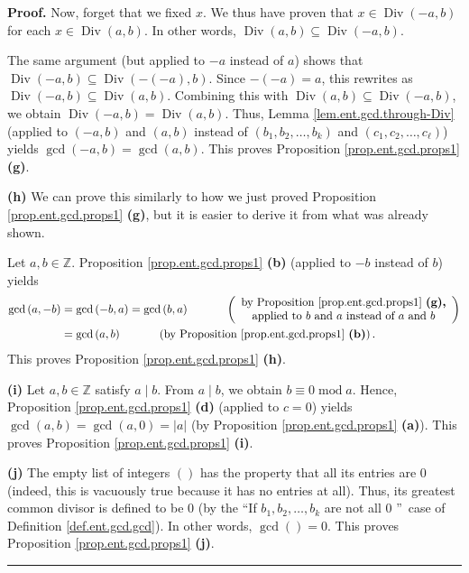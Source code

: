 \documentclass[numbers=enddot,12pt,final,onecolumn,notitlepage]{scrartcl}%
\numberwithin{exer}{subsection}
\theoremstyle{definition}
\newenvironment{proof}[1][Proof]{\noindent\textbf{#1.} }{\ \rule{0.5em}{0.5em}}
\begin{document}
\begin{proof}
Now, forget that we fixed $x$. We thus have proven that $x\in
\operatorname*{Div}\left(  -a,b\right)  $ for each $x\in\operatorname*{Div}%
\left(  a,b\right)  $. In other words, $\operatorname*{Div}\left(  a,b\right)
\subseteq\operatorname*{Div}\left(  -a,b\right)  $.

The same argument (but applied to $-a$ instead of $a$) shows that
$\operatorname*{Div}\left(  -a,b\right)  \subseteq\operatorname*{Div}\left(
-\left(  -a\right)  ,b\right)  $. Since $-\left(  -a\right)  =a$, this
rewrites as $\operatorname*{Div}\left(  -a,b\right)  \subseteq
\operatorname*{Div}\left(  a,b\right)  $. Combining this with
$\operatorname*{Div}\left(  a,b\right)  \subseteq\operatorname*{Div}\left(
-a,b\right)  $, we obtain $\operatorname*{Div}\left(  -a,b\right)
=\operatorname*{Div}\left(  a,b\right)  $. Thus, Lemma
\ref{lem.ent.gcd.through-Div} (applied to $\left(  -a,b\right)  $ and $\left(
a,b\right)  $ instead of $\left(  b_{1},b_{2},\ldots,b_{k}\right)  $ and
$\left(  c_{1},c_{2},\ldots,c_{\ell}\right)  $) yields $\gcd\left(
-a,b\right)  =\gcd\left(  a,b\right)  $. This proves Proposition
\ref{prop.ent.gcd.props1} \textbf{(g)}.

\textbf{(h)} We can prove this similarly to how we just proved Proposition
\ref{prop.ent.gcd.props1} \textbf{(g)}, but it is easier to derive it from
what was already shown.

Let $a,b\in\mathbb{Z}$. Proposition \ref{prop.ent.gcd.props1} \textbf{(b)}
(applied to $-b$ instead of $b$) yields%
\begin{align*}
\gcd\left(  a,-b\right)   &  =\gcd\left(  -b,a\right)  =\gcd\left(
b,a\right)  \ \ \ \ \ \ \ \ \ \ \left(
\begin{array}
[c]{c}%
\text{by Proposition \ref{prop.ent.gcd.props1} \textbf{(g),}}\\
\text{applied to }b\text{ and }a\text{ instead of }a\text{ and }b
\end{array}
\right) \\
&  =\gcd\left(  a,b\right)  \ \ \ \ \ \ \ \ \ \ \left(  \text{by Proposition
\ref{prop.ent.gcd.props1} \textbf{(b)}}\right)  .
\end{align*}
This proves Proposition \ref{prop.ent.gcd.props1} \textbf{(h)}.

\textbf{(i)} Let $a,b\in\mathbb{Z}$ satisfy $a\mid b$. From $a\mid b$, we
obtain $b\equiv0\operatorname{mod}a$. Hence, Proposition
\ref{prop.ent.gcd.props1} \textbf{(d)} (applied to $c=0$) yields $\gcd\left(
a,b\right)  =\gcd\left(  a,0\right)  =\left\vert a\right\vert $ (by
Proposition \ref{prop.ent.gcd.props1} \textbf{(a)}). This proves Proposition
\ref{prop.ent.gcd.props1} \textbf{(i)}.

\textbf{(j)} The empty list of integers $\left(  {}\right)  $ has the property
that all its entries are $0$ (indeed, this is vacuously true because it has no
entries at all). Thus, its greatest common divisor is defined to be $0$ (by
the \textquotedblleft If $b_{1},b_{2},\ldots,b_{k}$ are not all $0$%
\textquotedblright\ case of Definition \ref{def.ent.gcd.gcd}). In other words,
$\gcd\left(  {}\right)  =0$. This proves Proposition \ref{prop.ent.gcd.props1}
\textbf{(j)}.
\end{proof}
\end{document}
